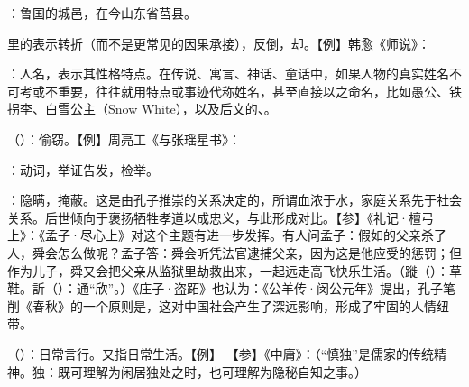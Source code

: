 {
\item {}：鲁国的城邑，在今山东省莒县。
\item {}里的表示转折（而不是更常见的因果承接），反倒，却。【例】韩愈《师说》：
}
{}


{
\item {}：人名，表示其性格特点。在传说、寓言、神话、童话中，如果人物的真实姓名不可考或不重要，往往就用特点或事迹代称姓名，甚至直接以之命名，比如愚公、铁拐李、白雪公主（Snow White），以及后文的、。
\item {}（）：偷窃。【例】周亮工《与张瑶星书》：
\item {}：动词，举证告发，检举。
\item {}：隐瞒，掩蔽。这是由孔子推崇的关系决定的，所谓血浓于水，家庭关系先于社会关系。后世倾向于褒扬牺牲孝道以成忠义，与此形成对比。【参】《礼记·檀弓上》：《孟子·尽心上》对这个主题有进一步发挥。有人问孟子：假如的父亲杀了人，舜会怎么做呢？孟子答：舜会听凭法官逮捕父亲，因为这是他应受的惩罚；但作为儿子，舜又会把父亲从监狱里劫救出来，一起远走高飞快乐生活。（蹝（）：草鞋。訢（）：通“欣”。）《庄子·盗跖》也认为：《公羊传·闵公元年》提出，孔子笔削《春秋》的一个原则是，这对中国社会产生了深远影响，形成了牢固的人情纽带。%
}
{}


{
\item {}（）：日常言行。又指日常生活。【例】 【参】《中庸》：（“慎独”是儒家的传统精神。独：既可理解为闲居独处之时，也可理解为隐秘自知之事。）
}
{}



